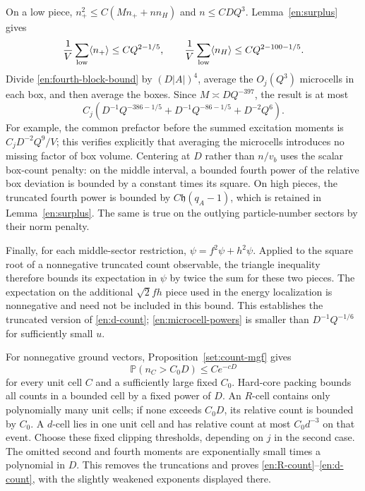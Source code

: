 On a low piece,
$n_+^2\le C(Mn_++nn_H)$ and $n\le CDQ^3$.
Lemma~\ref{en:surplus} gives
\begin{equation}\label{en:gap-number-bounds}
 \frac1V\sum_{\rm low}\langle n_+\rangle\le CQ^{2-1/5},
 \qquad
 \frac1V\sum_{\rm low}\langle n_H\rangle\le CQ^{2-100-1/5}.
\end{equation}
Divide \eqref{en:fourth-block-bound} by $(D|A|)^4$, average the
$O_j(Q^3)$ microcells in each box, and then average the boxes.  Since
$M\asymp DQ^{-397}$, the result is at most
\begin{equation}\label{en:microcell-powers}
 C_j\left(D^{-1}Q^{-386-1/5}
       +D^{-1}Q^{-86-1/5}+D^{-2}Q^6\right).
\end{equation}
For example, the common prefactor before the summed excitation
moments is $C_jD^{-2}Q^9/V$; this verifies explicitly that averaging
the microcells introduces no missing factor of box volume.
Centering at $D$ rather than $n/v_b$ uses the scalar box-count penalty:
on the middle interval, a bounded fourth power of the relative box
deviation is bounded by a constant times its square.  On high pieces,
the truncated fourth power is bounded by $C\mathfrak h(q_A-1)$, which
is retained in Lemma~\ref{en:surplus}.  The same is true on the
outlying particle-number sectors by their norm penalty.

Finally, for each middle-sector restriction,
$\psi=f^2\psi+h^2\psi$.  Applied to the square root of a nonnegative
truncated count observable, the triangle inequality therefore bounds
its expectation in $\psi$ by twice the sum for these two pieces.
The expectation on the additional $\sqrt2fh$ piece used in the energy
localization is nonnegative and need not be included in this bound.  This establishes the
truncated version of \eqref{en:d-count}; \eqref{en:microcell-powers} is
smaller than $D^{-1}Q^{-1/6}$ for sufficiently small $u$.

For nonnegative ground vectors, Proposition~\ref{set:count-mgf} gives
\begin{equation}\label{en:count-tail-use}
 \mathbb P(n_C>C_0D)\le Ce^{-cD}
\end{equation}
for every unit cell $C$ and a sufficiently large fixed $C_0$.
Hard-core packing bounds all counts in a bounded cell by a fixed power
of $D$.  An $R$-cell contains only polynomially many unit cells; if none
exceeds $C_0D$, its relative count is bounded by $C_0$.  A $d$-cell lies
in one unit cell and has relative count at most $C_0d^{-3}$ on that
event.  Choose these fixed clipping thresholds, depending on $j$ in the
second case.  The omitted second and fourth moments are exponentially
small times a polynomial in $D$.  This removes the truncations and proves
\eqref{en:R-count}--\eqref{en:d-count}, with the slightly weakened
exponents displayed there.

